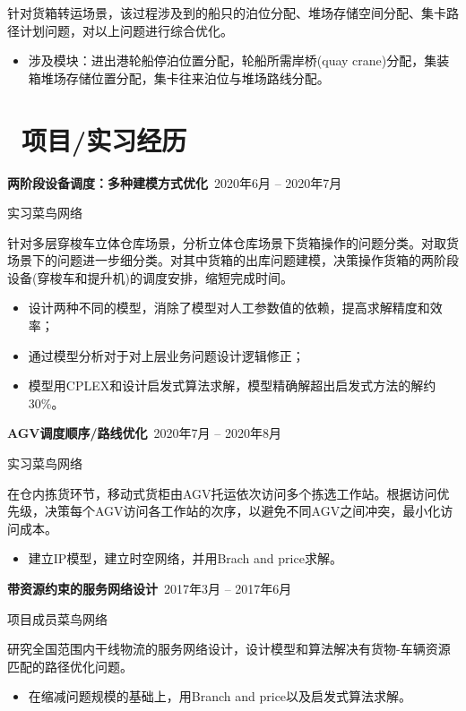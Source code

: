 \documentclass[11pt]{article}
\begin{document}
针对货箱转运场景，该过程涉及到的船只的泊位分配、堆场存储空间分配、集卡路径计划问题，对以上问题进行综合优化。

\begin{itemize}
  \item 涉及模块：进出港轮船停泊位置分配，轮船所需岸桥(quay crane)分配，集装箱堆场存储位置分配，集卡往来泊位与堆场路线分配。
\end{itemize}

\section{\makebox[\widthof{\faGraduationCap}][c]{\color{CVBlue}\faUsers}\ 项目/实习经历}

\textbf{两阶段设备调度：多种建模方式优化}\  \hfill 2020年6月 -- 2020年7月

实习\quad 菜鸟网络

针对多层穿梭车立体仓库场景，分析立体仓库场景下货箱操作的问题分类。对取货场景下的问题进一步细分类。对其中货箱的出库问题建模，决策操作货箱的两阶段设备(穿梭车和提升机)的调度安排，缩短完成时间。

\begin{itemize}
  \item 设计两种不同的模型，消除了模型对人工参数值的依赖，提高求解精度和效率；
  \item 通过模型分析对于对上层业务问题设计逻辑修正；
  \item 模型用CPLEX和设计启发式算法求解，模型精确解超出启发式方法的解约30\%。
\end{itemize}

\textbf{AGV调度顺序/路线优化}\  \hfill 2020年7月 -- 2020年8月

实习\quad 菜鸟网络

在仓内拣货环节，移动式货柜由AGV托运依次访问多个拣选工作站。根据访问优先级，决策每个AGV访问各工作站的次序，以避免不同AGV之间冲突，最小化访问成本。

\begin{itemize}
  \item 建立IP模型，建立时空网络，并用Brach and price求解。
\end{itemize}

\textbf{带资源约束的服务网络设计}\  \hfill 2017年3月 -- 2017年6月

项目成员\quad 菜鸟网络

研究全国范围内干线物流的服务网络设计，设计模型和算法解决有货物-车辆资源匹配的路径优化问题。

\begin{itemize}
  \item 在缩减问题规模的基础上，用Branch and price以及启发式算法求解。
\end{itemize}
\end{document}
